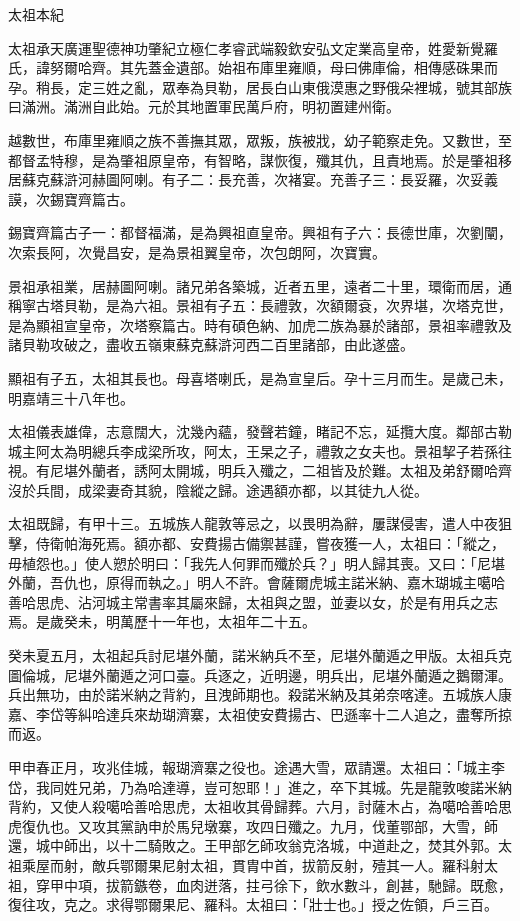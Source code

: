 
\begin{pinyinscope}
太祖本紀

太祖承天廣運聖德神功肇紀立極仁孝睿武端毅欽安弘文定業高皇帝，姓愛新覺羅氏，諱努爾哈齊。其先蓋金遺部。始祖布庫里雍順，母曰佛庫倫，相傳感硃果而孕。稍長，定三姓之亂，眾奉為貝勒，居長白山東俄漠惠之野俄朵裡城，號其部族曰滿洲。滿洲自此始。元於其地置軍民萬戶府，明初置建州衛。

越數世，布庫里雍順之族不善撫其眾，眾叛，族被戕，幼子範察走免。又數世，至都督孟特穆，是為肇祖原皇帝，有智略，謀恢復，殲其仇，且責地焉。於是肇祖移居蘇克蘇滸河赫圖阿喇。有子二：長充善，次褚宴。充善子三：長妥羅，次妥義謨，次錫寶齊篇古。

錫寶齊篇古子一：都督福滿，是為興祖直皇帝。興祖有子六：長德世庫，次劉闡，次索長阿，次覺昌安，是為景祖翼皇帝，次包朗阿，次寶實。

景祖承祖業，居赫圖阿喇。諸兄弟各築城，近者五里，遠者二十里，環衛而居，通稱寧古塔貝勒，是為六祖。景祖有子五：長禮敦，次額爾袞，次界堪，次塔克世，是為顯祖宣皇帝，次塔察篇古。時有碩色納、加虎二族為暴於諸部，景祖率禮敦及諸貝勒攻破之，盡收五嶺東蘇克蘇滸河西二百里諸部，由此遂盛。

顯祖有子五，太祖其長也。母喜塔喇氏，是為宣皇后。孕十三月而生。是歲己未，明嘉靖三十八年也。

太祖儀表雄偉，志意闊大，沈幾內蘊，發聲若鐘，睹記不忘，延攬大度。鄰部古勒城主阿太為明總兵李成梁所攻，阿太，王杲之子，禮敦之女夫也。景祖挈子若孫往視。有尼堪外蘭者，誘阿太開城，明兵入殲之，二祖皆及於難。太祖及弟舒爾哈齊沒於兵間，成梁妻奇其貌，陰縱之歸。途遇額亦都，以其徒九人從。

太祖既歸，有甲十三。五城族人龍敦等忌之，以畏明為辭，屢謀侵害，遣人中夜狙擊，侍衛帕海死焉。額亦都、安費揚古備禦甚謹，嘗夜獲一人，太祖曰：「縱之，毋植怨也。」使人愬於明曰：「我先人何罪而殲於兵？」明人歸其喪。又曰：「尼堪外蘭，吾仇也，原得而執之。」明人不許。會薩爾虎城主諾米納、嘉木瑚城主噶哈善哈思虎、沾河城主常書率其屬來歸，太祖與之盟，並妻以女，於是有用兵之志焉。是歲癸未，明萬歷十一年也，太祖年二十五。

癸未夏五月，太祖起兵討尼堪外蘭，諾米納兵不至，尼堪外蘭遁之甲版。太祖兵克圖倫城，尼堪外蘭遁之河口臺。兵逐之，近明邊，明兵出，尼堪外蘭遁之鵝爾渾。兵出無功，由於諾米納之背約，且洩師期也。殺諾米納及其弟奈喀達。五城族人康嘉、李岱等糾哈達兵來劫瑚濟寨，太祖使安費揚古、巴遜率十二人追之，盡奪所掠而返。

甲申春正月，攻兆佳城，報瑚濟寨之役也。途遇大雪，眾請還。太祖曰：「城主李岱，我同姓兄弟，乃為哈達導，豈可恕耶！」進之，卒下其城。先是龍敦唆諾米納背約，又使人殺噶哈善哈思虎，太祖收其骨歸葬。六月，討薩木占，為噶哈善哈思虎復仇也。又攻其黨訥申於馬兒墩寨，攻四日殲之。九月，伐董鄂部，大雪，師還，城中師出，以十二騎敗之。王甲部乞師攻翁克洛城，中道赴之，焚其外郭。太祖乘屋而射，敵兵鄂爾果尼射太祖，貫胄中首，拔箭反射，殪其一人。羅科射太祖，穿甲中項，拔箭鏃卷，血肉迸落，拄弓徐下，飲水數斗，創甚，馳歸。既愈，復往攻，克之。求得鄂爾果尼、羅科。太祖曰：「壯士也。」授之佐領，戶三百。


\end{pinyinscope}
